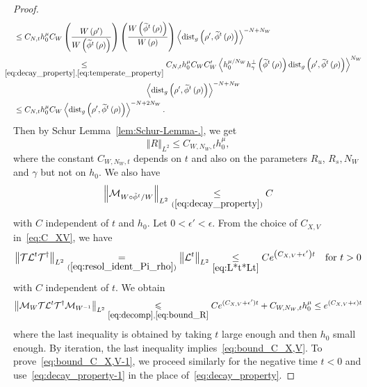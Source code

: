 \documentclass[10pt]{amsart}
\theoremstyle{definition}\newtheorem{defi}[theo]{Definition}\newtheorem{rema}[theo]{Remark}\newtheorem{exam}[theo]{Example}\newtheorem{exem}[theo]{Example}\newtheorem{nota}[theo]{Notation}
\newcommand*\eq[1]{\underset{(#1)}{=}}
\newcommand*\ineq[1]{\underset{(#1)}{\leq}}
\newcommand{\clT}{\mathcal{T}}
\newcommand{\clL}{\mathcal{L}}
\newcommand{\clM}{\mathcal{M}}
\newcommand{\dist}{\mathrm{dist}}
\let\oldtilde\tilde
\renewcommand*{\tilde}[1]{\mathchoice{\widetilde{#1}}{\widetilde{#1}}{\oldtilde{#1}}{\oldtilde{#1}}}
\begin{document}
\begin{proof}
\begin{align}
&\leq  C_{N,t}h_{0}^{\mu}C_{W}\left(\frac{W\left(\rho'\right)}{W\left(\tilde{\phi}^{t}\left(\rho\right)\right)}\right)\left(\frac{W\left(\tilde{\phi}^{t}\left(\rho\right)\right)}{W\left(\rho\right)}\right)\left\langle \dist_{g}\left(\rho',\tilde{\phi}^{t}\left(\rho\right)\right)\right\rangle ^{-N+N_{W}}\nonumber\\
&\mkern-25mu\underset{\eqref{eq:decay_property},\eqref{eq:temperate_property}}{\leq}  C_{N,t}h_{0}^{\mu}C_{W}C'_{W}\left\langle h_{0}^{\mu/N_{W}}h_{\gamma}^{\perp}\left(\tilde{\phi}^{t}\left(\rho\right)\right)\dist_{g}\left(\rho',\tilde{\phi}^{t}\left(\rho\right)\right)\right\rangle ^{N_{W}}\nonumber\\
&\mkern293mu\left\langle \dist_{g}\left(\rho',\tilde{\phi}^{t}\left(\rho\right)\right)\right\rangle ^{-N+N_{W}}
\nonumber\\
&\leq  C_{N,t}h_{0}^{\mu}C_{W}\left\langle \dist_{g}\left(\rho',\tilde{\phi}^{t}\left(\rho\right)\right)\right\rangle ^{-N+2N_{W}}\nonumber.\label{eq:res_int}
\end{align}
Then by Schur Lemma~\ref{lem:Schur-Lemma-.}, we get
\begin{equation}\label{eq:bound_R}
\left\Vert R\right\Vert _{L^{2}}\le C_{W,N_{W},t}h_{0}^{\mu},
\end{equation}
where the constant $C_{W,N_{W},t}$ depends on $t$ and also on the parameters $R_{u}$, $R_{s},N_{W}$ and $\gamma$ but not on $h_{0}$. We also have
\[
\left\Vert \clM_{W\circ\tilde{\phi}^{t}/W}\right\Vert _{L^{2}}\ineq{\ref{eq:decay_property}}C
\]
with $C$ independent of $t$ and $h_{0}$. Let $0<\epsilon'<\epsilon$. From the choice of $C_{X,V}$ in~\eqref{eq:C_XV}, we have
\[
\left\Vert \ensuremath{\clT}\ensuremath{\clL^{t}}\ensuremath{\clT^{\dagger}}\right\Vert _{L^{2}}\eq{\ref{eq:resol_ident_Pi_rho}}\ensuremath{\left\Vert \clL^{t}\right\Vert _{L^{2}}}\underset{\eqref{eq:L*t*Lt}}{\leq}Ce^{\left(C_{X,V}+\epsilon'\right)t}\quad\text{for }t>0
\]
with $C$ independent of $t$. We obtain
\[
\left\Vert \clM_{W}\text{\ensuremath{\clT}\ensuremath{\clL^{t}}\ensuremath{\clT^{\dagger}}}\clM_{W^{-1}}\right\Vert _{L^{2}}\underset{\eqref{eq:decomp},\eqref{eq:bound_R}}{\leqslant}Ce^{(C_{X,V}+\epsilon')t}+C_{W,N_{W},t}h_{0}^{\mu}\le e^{(C_{X,V}+\epsilon)t}
\]
where the last inequality is obtained by taking $t$ large enough and then $h_{0}$ small enough. By iteration, the last inequality implies~\eqref{eq:bound_C_X,V}. To prove~\eqref{eq:bound_C_X,V-1}, we proceed similarly for the negative time $t<0$ and use~\eqref{eq:decay_property-1} in the place of~\eqref{eq:decay_property}.
\end{proof}
\end{document}
